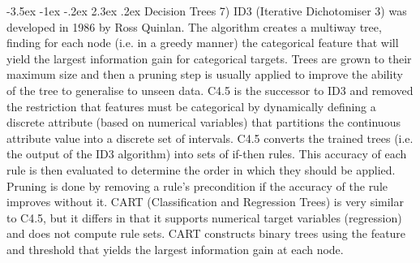 \documentclass[11pt]{article}
\makeatletter
\renewcommand\section{\@startsection {section}{1}{\z@}%
                                       {-3.5ex \@plus -1ex \@minus -.2ex}%
                                       {2.3ex \@plus.2ex}%
                                       {\normalfont\fontfamily{phv}\fontsize{16}{19}\bfseries}}
\makeatother
\begin{document}
\section{Decision Trees}
7) ID3 (Iterative Dichotomiser 3) was developed in 1986 by Ross Quinlan. The algorithm creates a multiway tree, finding for each node (i.e. in a greedy manner) the categorical feature that will yield the largest information gain for categorical targets. Trees are grown to their maximum size and then a pruning step is usually applied to improve the ability of the tree to generalise to unseen data. 
C4.5 is the successor to ID3 and removed the restriction that features must be categorical by dynamically defining a discrete attribute (based on numerical variables) that partitions the continuous attribute value into a discrete set of intervals. C4.5 converts the trained trees (i.e. the output of the ID3 algorithm) into sets of if-then rules. This accuracy of each rule is then evaluated to determine the order in which they should be applied. Pruning is done by removing a rule’s precondition if the accuracy of the rule improves without it.
CART (Classification and Regression Trees) is very similar to C4.5, but it differs in that it supports numerical target variables (regression) and does not compute rule sets. CART constructs binary trees using the feature and threshold that yields the largest information gain at each node.
\end{document}
